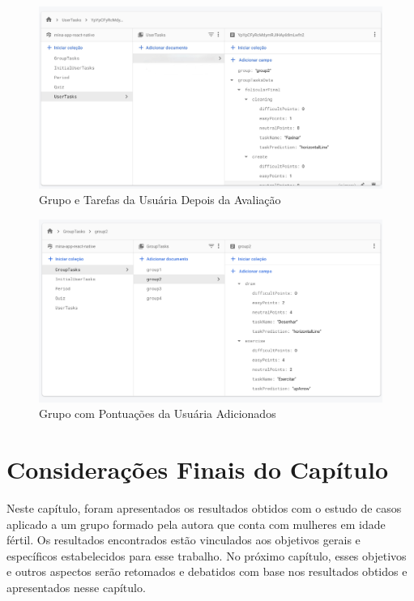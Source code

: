 \begin{figure}[htbp]
	\caption{Grupo e Tarefas da Usuária Depois da Avaliação}
	\begin{center}
	\includegraphics[keepaspectratio=true,scale=0.37]{figuras/db4.jpeg}
	\end{center}
    \label{fig24}
\end{figure}

\begin{figure}[htbp]
	\caption{Grupo com Pontuações da Usuária Adicionados}
	\begin{center}
	\includegraphics[keepaspectratio=true,scale=0.37]{figuras/db3.png}
	\end{center}
    \label{fig25}
\end{figure}


\section{Considerações Finais do Capítulo}

Neste capítulo, foram apresentados os resultados obtidos com o estudo de casos aplicado a um grupo formado pela autora que conta com 
mulheres em idade fértil. Os resultados encontrados
estão vinculados aos objetivos gerais e específicos estabelecidos para esse trabalho. No próximo capítulo,
esses objetivos e outros aspectos serão retomados e debatidos com base nos resultados
obtidos e apresentados nesse capítulo.
